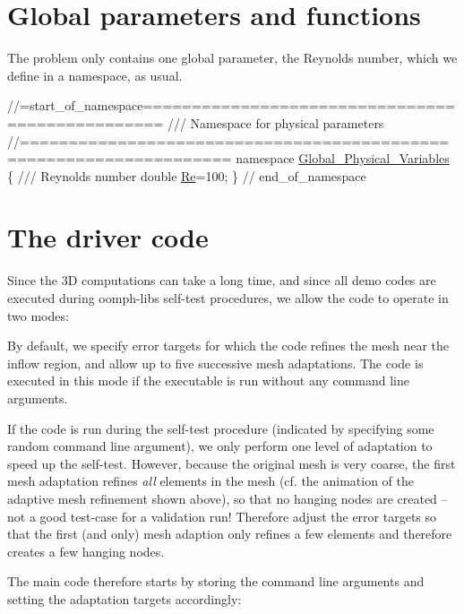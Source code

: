  

\hypertarget{index_namespace}{}\section{Global parameters and functions}\label{index_namespace}
The problem only contains one global parameter, the Reynolds number, which we define in a namespace, as usual.

 
\begin{DoxyCodeInclude}
\textcolor{comment}{//=start\_of\_namespace================================================}
\textcolor{comment}{/// Namespace for physical parameters}
\textcolor{comment}{}\textcolor{comment}{//===================================================================}
\textcolor{keyword}{namespace }\hyperlink{namespaceGlobal__Physical__Variables}{Global\_Physical\_Variables}
\{\textcolor{comment}{}
\textcolor{comment}{ /// Reynolds number}
\textcolor{comment}{} \textcolor{keywordtype}{double} \hyperlink{namespaceGlobal__Physical__Variables_ab814e627d2eb5bc50318879d19ab16b9}{Re}=100;
\} \textcolor{comment}{// end\_of\_namespace}

\end{DoxyCodeInclude}




 

\hypertarget{index_main}{}\section{The driver code}\label{index_main}
Since the 3D computations can take a long time, and since all demo codes are executed during {\ttfamily oomph-\/lib\textquotesingle{}s} self-\/test procedures, we allow the code to operate in two modes\+:
\begin{DoxyItemize}
\item By default, we specify error targets for which the code refines the mesh near the inflow region, and allow up to five successive mesh adaptations. The code is executed in this mode if the executable is run without any command line arguments.
\item If the code is run during the self-\/test procedure (indicated by specifying some random command line argument), we only perform one level of adaptation to speed up the self-\/test. However, because the original mesh is very coarse, the first mesh adaptation refines {\itshape all} elements in the mesh (cf. the animation of the adaptive mesh refinement shown above), so that no hanging nodes are created -- not a good test-\/case for a validation run! Therefore adjust the error targets so that the first (and only) mesh adaption only refines a few elements and therefore creates a few hanging nodes.
\end{DoxyItemize}The main code therefore starts by storing the command line arguments and setting the adaptation targets accordingly\+:


